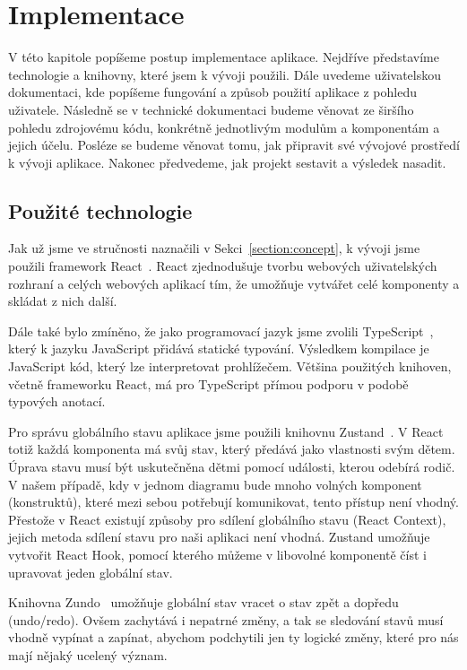 \chapter{Implementace}\label{chapter:implementace}

V této kapitole popíšeme postup implementace aplikace.
Nejdříve představíme technologie a knihovny, které jsem k vývoji použili.
Dále uvedeme uživatelskou dokumentaci, kde popíšeme fungování a způsob použití aplikace z pohledu uživatele.
Následně se v technické dokumentaci budeme věnovat ze širšího pohledu zdrojovému kódu, konkrétně jednotlivým modulům a komponentám a jejich účelu.
Posléze se budeme věnovat tomu, jak připravit své vývojové prostředí k vývoji aplikace.
Nakonec předvedeme, jak projekt sestavit a výsledek nasadit.

\section{Použité technologie}

Jak už jsme ve stručnosti naznačili v Sekci~\ref{section:concept}, k vývoji jsme použili framework React~\cite{react_2023}.
React zjednodušuje tvorbu webových uživatelských rozhraní a celých webových aplikací tím, že umožňuje vytvářet celé komponenty a skládat z nich další.

Dále také bylo zmíněno, že jako programovací jazyk jsme zvolili TypeScript~\cite{microsoft_typescriptjavascript_}, který k jazyku JavaScript přidává statické typování.
Výsledkem kompilace je JavaScript kód, který lze interpretovat prohlížečem.
Většina použitých knihoven, včetně frameworku React, má pro TypeScript přímou podporu v podobě typových anotací.

Pro správu globálního stavu aplikace jsme použili knihovnu Zustand~\cite{daishikato_zustand_2019}.
V React totiž každá komponenta má svůj stav, který předává jako vlastnosti svým dětem.
Úprava stavu musí být uskutečněna dětmi pomocí události, kterou odebírá rodič.
V našem případě, kdy v jednom diagramu bude mnoho volných komponent (konstruktů), které mezi sebou potřebují komunikovat, tento přístup není vhodný.
Přestože v React existují způsoby pro sdílení globálního stavu (React Context), jejich metoda sdílení stavu pro naši aplikaci není vhodná.
Zustand umožňuje vytvořit React Hook, pomocí kterého můžeme v libovolné komponentě číst i upravovat jeden globální stav.

Knihovna Zundo~\cite{kornoelje_zundo_2021} umožňuje globální stav vracet o stav zpět a dopředu (undo/redo).
Ovšem zachytává i nepatrné změny, a tak se sledování stavů musí vhodně vypínat a zapínat, abychom podchytili jen ty logické změny, které pro nás mají nějaký ucelený význam.

